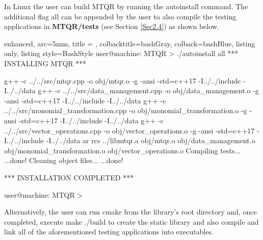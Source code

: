 \documentclass[a4paper, twosided]{book}
\begin{document}
In Linux the user can build MTQR by running the \colorbox{poliGrayBlue}{autoinstall} command. The additional flag \colorbox{poliGrayBlue}{all} can be appended by the user to also compile the testing applications in \colorbox{poliGrayBlue}{\textbf{MTQR/tests}} (see Section \ref{Sec2.4}) as shown below.

\begin{tcblisting}{enhanced,
                   arc=5mm,
                   title = \color{black}{\large \ttfamily Build using the shell script},
                   colbacktitle=bashGray,
                   colback=bashBlue,
                   listing only,
                   listing style=BashStyle}
user@machine: MTQR > ./autoinstall all
 *** INSTALLING MTQR ***

g++ -c ../../src/mtqr.cpp -o obj/mtqr.o -g -ansi -std=c++17  -I../../include  -I../../data
g++ -c ../../src/data_management.cpp -o obj/data_management.o -g -ansi -std=c++17  -I../../include  -I../../data
g++ -c ../../src/monomial_transformation.cpp -o obj/monomial_transformation.o -g -ansi -std=c++17  -I../../include  -I../../data
g++ -c ../../src/vector_operations.cpp -o obj/vector_operations.o -g -ansi -std=c++17  -I../../include  -I../../data
ar rcs ../libmtqr.a obj/mtqr.o obj/data_management.o obj/monomial_transformation.o obj/vector_operations.o
Compiling tests...
...done!
Cleaning object files...
...done!
 
 *** INSTALLATION COMPLETED ***

 user@machine: MTQR >
\end{tcblisting}
\vspace{0.25cm}

\noindent
Alternatively, the user can run \colorbox{poliGrayBlue}{cmake} from the library's root directory and, once completed, execute \colorbox{poliGrayBlue}{make ./build} to create the static library and also compile and link all of the aforementioned testing applications into executables.
\end{document}
